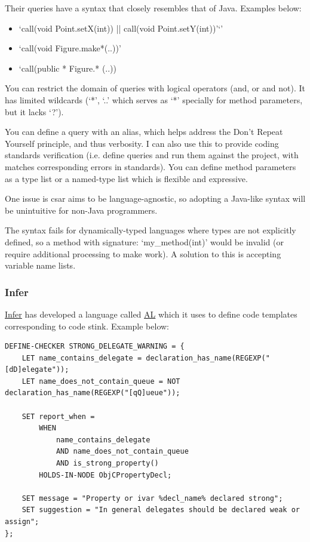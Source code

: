 \documentclass[12pt, letterpaper]{article}
\begin{document}
Their queries have a syntax that closely resembles that of Java. Examples below:
\begin{itemize}
  \item `call(void Point.setX(int)) || call(void Point.setY(int))'`'
  \item `call(void Figure.make*(..))'
  \item `call(public * Figure.* (..))
\end{itemize}

You can restrict the domain of queries with logical operators (and, or and not).
It has limited wildcards (`*', `..' which serves as `*' specially for method parameters, but it lacks `?').

You can define a query with an alias, which helps address the Don't Repeat Yourself principle, and thus verbosity.
I can also use this to provide coding standards verification (i.e. define queries and run them against the project, with matches corresponding errors in standards).
You can define method parameters as a type list or a named-type list which is flexible and expressive.

One issue is csar aims to be language-agnostic, so adopting a Java-like syntax will be unintuitive for non-Java programmers.

The syntax fails for dynamically-typed languages where types are not explicitly defined, so a method with signature: `my\_method(int)' would be invalid (or require additional processing to make work).
A solution to this is accepting variable name lists.

\subsubsection{Infer}
\href{https://github.com/facebook/infer}{Infer} has developed a language called \href{https://code.facebook.com/posts/277643589367408/}{AL} which it uses to define code templates corresponding to code stink. Example below:  

\begin{lstlisting}
DEFINE-CHECKER STRONG_DELEGATE_WARNING = {
    LET name_contains_delegate = declaration_has_name(REGEXP("[dD]elegate"));
    LET name_does_not_contain_queue = NOT declaration_has_name(REGEXP("[qQ]ueue"));

    SET report_when =
        WHEN
            name_contains_delegate
            AND name_does_not_contain_queue
            AND is_strong_property()
        HOLDS-IN-NODE ObjCPropertyDecl;

    SET message = "Property or ivar %decl_name% declared strong";
    SET suggestion = "In general delegates should be declared weak or assign";
};
\end{lstlisting}
\end{document}
